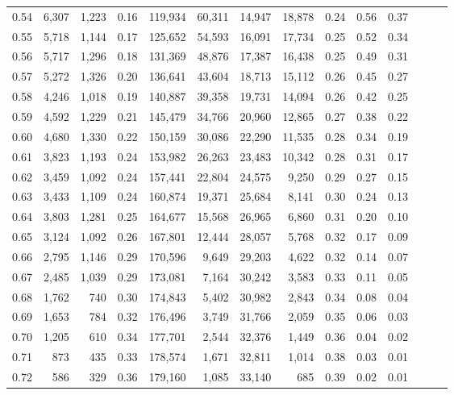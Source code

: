 \begin{tabular}{rrrrrrrrrrrrrr}
0.54 &  6,307 &  1,223 &  0.16 &  119,934 &   60,311 &  14,947 &  18,878 &  0.24 &  0.56 &      0.37 \\
0.55 &  5,718 &  1,144 &  0.17 &  125,652 &   54,593 &  16,091 &  17,734 &  0.25 &  0.52 &      0.34 \\
0.56 &  5,717 &  1,296 &  0.18 &  131,369 &   48,876 &  17,387 &  16,438 &  0.25 &  0.49 &      0.31 \\
0.57 &  5,272 &  1,326 &  0.20 &  136,641 &   43,604 &  18,713 &  15,112 &  0.26 &  0.45 &      0.27 \\
0.58 &  4,246 &  1,018 &  0.19 &  140,887 &   39,358 &  19,731 &  14,094 &  0.26 &  0.42 &      0.25 \\
0.59 &  4,592 &  1,229 &  0.21 &  145,479 &   34,766 &  20,960 &  12,865 &  0.27 &  0.38 &      0.22 \\
0.60 &  4,680 &  1,330 &  0.22 &  150,159 &   30,086 &  22,290 &  11,535 &  0.28 &  0.34 &      0.19 \\
0.61 &  3,823 &  1,193 &  0.24 &  153,982 &   26,263 &  23,483 &  10,342 &  0.28 &  0.31 &      0.17 \\
0.62 &  3,459 &  1,092 &  0.24 &  157,441 &   22,804 &  24,575 &   9,250 &  0.29 &  0.27 &      0.15 \\
0.63 &  3,433 &  1,109 &  0.24 &  160,874 &   19,371 &  25,684 &   8,141 &  0.30 &  0.24 &      0.13 \\
0.64 &  3,803 &  1,281 &  0.25 &  164,677 &   15,568 &  26,965 &   6,860 &  0.31 &  0.20 &      0.10 \\
0.65 &  3,124 &  1,092 &  0.26 &  167,801 &   12,444 &  28,057 &   5,768 &  0.32 &  0.17 &      0.09 \\
0.66 &  2,795 &  1,146 &  0.29 &  170,596 &    9,649 &  29,203 &   4,622 &  0.32 &  0.14 &      0.07 \\
0.67 &  2,485 &  1,039 &  0.29 &  173,081 &    7,164 &  30,242 &   3,583 &  0.33 &  0.11 &      0.05 \\
0.68 &  1,762 &    740 &  0.30 &  174,843 &    5,402 &  30,982 &   2,843 &  0.34 &  0.08 &      0.04 \\
0.69 &  1,653 &    784 &  0.32 &  176,496 &    3,749 &  31,766 &   2,059 &  0.35 &  0.06 &      0.03 \\
0.70 &  1,205 &    610 &  0.34 &  177,701 &    2,544 &  32,376 &   1,449 &  0.36 &  0.04 &      0.02 \\
0.71 &    873 &    435 &  0.33 &  178,574 &    1,671 &  32,811 &   1,014 &  0.38 &  0.03 &      0.01 \\
0.72 &    586 &    329 &  0.36 &  179,160 &    1,085 &  33,140 &     685 &  0.39 &  0.02 &      0.01 \\

\end{tabular}

